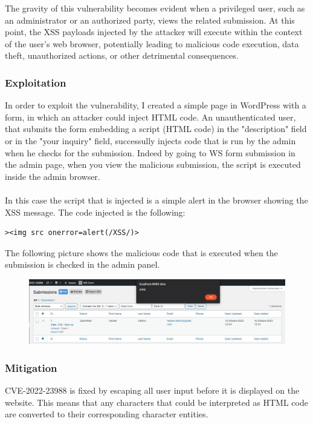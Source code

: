 \documentclass{article}
\begin{document}
The gravity of this vulnerability becomes evident when a privileged user, such as an administrator or an authorized party, views the related submission. At this point, the XSS payloads injected by the attacker will execute within the context of the user's web browser, potentially leading to malicious code execution, data theft, unauthorized actions, or other detrimental consequences.

	\subsubsection{Exploitation}
	In order to exploit the vulnerability, I created a simple page in WordPress with a form, in which an attacker could inject HTML code. An unauthenticated user, that submits the form embedding a script (HTML code) in the "description" field or in the "your inquiry" field, successully injects code that is run by the admin when he checks for the submission. Indeed by going to WS form submission in the admin page, when you view the malicious submission, the script is executed inside the admin browser. \\ \\
	In this case the script that is injected is a simple alert in the browser showing the XSS message. The code injected is the following: 
	\begin{lstlisting}[style=HTML]
	><img src onerror=alert(/XSS/)>
	\end{lstlisting}
	The following picture shows the malicious code that is executed when the submission is checked in the admin panel.
	\begin{figure}[htbp]
    \centering
    \includegraphics[width=1\textwidth]{XSS} 
	\end{figure}
	
	 
	\subsubsection{Mitigation}
	CVE-2022-23988 is fixed by escaping all user input before it is displayed on the website. This means that any characters that could be interpreted as HTML code are converted to their corresponding character entities. \\
	
\end{document}
